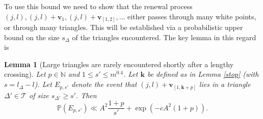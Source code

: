 \documentclass[12pt,a4paper,reqno]{amsart}
\numberwithin{equation}{section}
\theoremstyle{plain}
\newtheorem{lemma}[theorem]{Lemma}
\theoremstyle{definition}
\renewcommand\P{\mathbb{P}}
\newcommand\N{\mathbb{N}}
\renewcommand\k{\mathbf{k}}
\renewcommand\v{\mathbf{v}}
\begin{document}
To use this bound we need to show that the renewal process $(j,l), (j,l) + \v_1, (j,l) + \v_{[1,2]},\dots$ either passes through many white points, or through many triangles.  This will be established via a probabilistic upper bound on the size $s_\Delta$ of the triangles encountered.  The key lemma in this regard is

\begin{lemma}[Large triangles are rarely encountered shortly after a lengthy crossing]  Let $p \in \N$ and $1 \leq s' \leq m^{0.4}$. Let $\k$ be defined as in Lemma \ref{stop} (with $s = l_\Delta - l$). Let $E_{p,s'}$ denote the event that $(j,l) + \v_{[1,\k+p]}$ lies in a triangle $\Delta' \in {\mathcal T}$ of size $s_{\Delta'} \geq s'$.  Then
$$ \P( E_{p,s'} ) \ll A^2 \frac{1+p}{s'} + \exp( - c A^2 (1+p) ).$$
\end{lemma}
\end{document}
